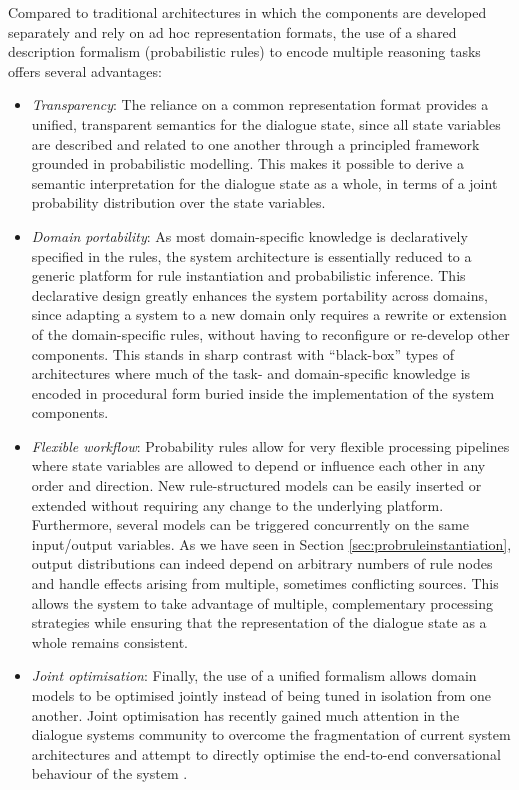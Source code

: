 Compared to traditional architectures in which the components are developed separately and rely on ad hoc representation formats, the use of a shared description formalism (probabilistic rules) to encode multiple reasoning tasks offers several advantages:
\begin{itemize}
\item \textit{Transparency}:  The reliance on a common representation format provides a unified, transparent semantics for the dialogue state, since all state variables are described and related to one another through a principled framework grounded in probabilistic modelling.  This makes it possible to derive a semantic interpretation for the dialogue state as a whole, in terms of a joint probability distribution over the state variables. 

\item \textit{Domain portability}:   As most domain-specific knowledge is declaratively specified in the rules, the system architecture is essentially reduced to a generic platform for rule instantiation and probabilistic inference.  This declarative design greatly enhances the system portability across domains, since adapting a system to a new domain only requires a rewrite or extension of the domain-specific rules, without having to reconfigure or re-develop other components.  This stands in sharp contrast with ``black-box'' types of architectures where much of the task- and domain-specific knowledge is encoded in procedural form buried inside the implementation of the system components.

\item \textit{Flexible workflow}:  Probability rules allow for very flexible processing pipelines where state variables are allowed to depend or influence each other in any order and direction.  New rule-structured models can be easily inserted or extended without requiring any change to the underlying platform. Furthermore, several models can be triggered concurrently on the same input/output variables. As we have seen in Section \ref{sec:probruleinstantiation}, output distributions can indeed depend on arbitrary numbers of rule nodes and handle effects arising from multiple, sometimes conflicting sources. This allows the system to take advantage of multiple, complementary processing strategies while ensuring that the representation of the dialogue state as a whole remains consistent. 

\item \textit{Joint optimisation}:  Finally, the use of a unified formalism allows domain models to be optimised jointly instead of being tuned in isolation from one another. Joint optimisation has recently gained much attention in the dialogue systems community to overcome the fragmentation of current system architectures and attempt to directly optimise the end-to-end conversational behaviour of the system \citep[see also][]{Lemon:2011}. 

\end{itemize}


